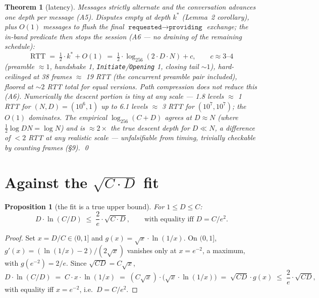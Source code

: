 \documentclass[11pt]{article}
\newcommand{\code}[1]{\texttt{#1}}
\theoremstyle{plain}
\newtheorem{theorem}{Theorem}
\newtheorem{proposition}{Proposition}
\begin{document}
\begin{theorem}[latency]
Messages strictly alternate and the conversation advances one depth per
message (A5). Disputes empty at depth $k^*$ (Lemma~2 corollary), plus
$O(1)$ messages to flush the final
$\code{requested} \to \code{providing}$ exchange; the in-band predicate
then stops the session (A6 --- no draining of the remaining schedule):
\begin{equation*}
\mathrm{RTT} \;=\; \tfrac{1}{2} \cdot k^* + O(1)
\;=\; \tfrac{1}{2} \cdot \log_{256}(2 \cdot D \cdot N) + c,
\qquad c \approx 3\text{--}4
\end{equation*}
(preamble $\approx 1$, handshake 1, \code{Initiate}/\code{Opening} 1,
closing tail ${\sim}1$), hard-ceilinged at 38 frames $\approx$ 19 RTT
(the concurrent preamble pair included),
floored at ${\sim}2$ RTT total for equal versions. Path compression does
not reduce this (A6). Numerically the \emph{descent} portion is tiny at any
scale --- 1.8 levels $\approx$ 1 RTT for $(N, D) = (10^6, 1)$ up to 6.1
levels $\approx$ 3 RTT for $(10^7, 10^7)$; the $O(1)$ dominates. The
empirical $\log_{256}(C + D)$ agrees at $D \approx N$ (where
$\tfrac{1}{2} \log DN = \log N$) and is $\approx 2\times$ the true descent
depth for $D \ll N$, a difference of $< 2$ RTT at any realistic scale ---
unfalsifiable from timing, trivially checkable by counting frames (\S9). \qed
\end{theorem}

\section{Against the \texorpdfstring{$\sqrt{C \cdot D}$}{sqrt(C·D)} fit}

\begin{proposition}[the fit is a true upper bound]
For $1 \le D \le C$:
\begin{equation*}
D \cdot \ln(C/D) \;\le\; \frac{2}{e} \cdot \sqrt{C \cdot D},
\qquad \text{with equality iff } D = C/e^2.
\end{equation*}
\end{proposition}

\begin{proof}
Set $x = D/C \in (0, 1]$ and $g(x) = \sqrt{x} \cdot \ln(1/x)$. On $(0, 1]$,
$g'(x) = (\ln(1/x) - 2)/(2\sqrt{x})$ vanishes only at $x = e^{-2}$, a
maximum, with $g(e^{-2}) = 2/e$. Since $\sqrt{CD} = C\sqrt{x}$,
\begin{equation*}
D \cdot \ln(C/D)
\;=\; C \cdot x \cdot \ln(1/x)
\;=\; (C\sqrt{x}) \cdot \bigl(\sqrt{x} \cdot \ln(1/x)\bigr)
\;=\; \sqrt{CD} \cdot g(x)
\;\le\; \frac{2}{e} \cdot \sqrt{CD},
\end{equation*}
with equality iff $x = e^{-2}$, i.e.\ $D = C/e^2$.
\end{proof}
\end{document}
